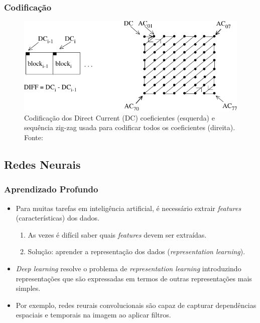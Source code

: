 \documentclass{beamer}
\begin{document}
\begin{frame}
\frametitle{Codificação}
\begin{figure}
\includegraphics[width=\textwidth]{figs/coding_jpeg.pdf}
\caption{Codificação dos Direct Current (DC) coeficientes (esquerda) e sequência zig-zag usada para codificar todos os coeficientes (direita). Fonte:~\cite{jpeg}}
\end{figure}
\end{frame}
\subsection{Redes Neurais}
\begin{frame}
\frametitle{Aprendizado Profundo}
\begin{itemize}
\item Para muitas tarefas em inteligência artificial, é necessário extrair \textit{features} (características) dos dados.
\begin{enumerate}
\item As vezes é difícil saber quais \textit{features} devem ser extraídas.
\item Solução: aprender a representação dos dados (\textit{representation learning}).
\end{enumerate}
\item \textit{Deep learning} resolve o problema de \textit{representation learning} introduzindo representações que são expressadas em termos de outras representações mais simples.
\item Por exemplo, redes reurais convolucionais são capaz de capturar dependências espaciais e temporais na imagem ao aplicar filtros.
\end{itemize} 
\end{frame}
\end{document}
